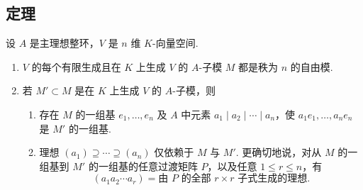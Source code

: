 \subsection{定理}\label{sec:galois-1-10-4}
\begin{theorem*}
设 $A$ 是主理想整环，$V$ 是 $n$ 维 $K$-向量空间.
\begin{enumerate}[label=\roman*)]
\item $V$ 的每个有限生成且在 $K$ 上生成 $V$ 的 $A$-子模 $M$ 都是秩为 $n$ 的自由模.
\item 若 $M'\subset M$ 是在 $K$ 上生成 $V$ 的 $A$-子模，则
\begin{enumerate}[label=(\alph*)]
\item 存在 $M$ 的一组基 $e_1,\ldots,e_n$ 及 $A$ 中元素 $a_1\mid a_2\mid\cdots\mid a_n$，使 $a_1e_1,\ldots,a_ne_n$ 是 $M'$ 的一组基.
\item 理想 $(a_1)\supseteq\cdots\supseteq(a_n)$ 仅依赖于 $M$ 与 $M'$. 更确切地说，对从 $M$ 的一组基到 $M'$ 的一组基的任意过渡矩阵 $P$，以及任意 $1\le r\le n$，有
\[(a_1a_2\cdots a_r)=\text{由 $P$ 的全部 $r\times r$ 子式生成的理想}.\]
\end{enumerate}
\end{enumerate}
\end{theorem*}
